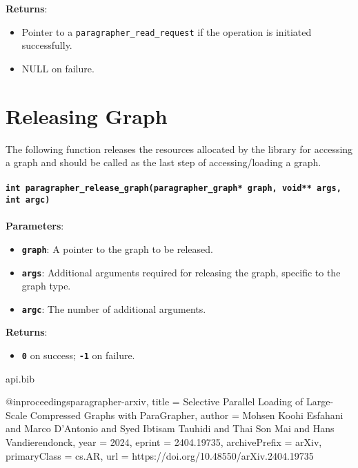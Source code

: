\documentclass[a4paper]{article}
\begin{document}
\textbf{Returns}:
\begin{itemize}
    \setlength{\itemsep}{0pt}
    \setlength{\parskip}{0pt}
    \setlength{\parsep}{0pt}

    \item Pointer to a \texttt{paragrapher\_read\_request} if the operation is initiated successfully.
    \item NULL on failure.
\end{itemize}

\section{Releasing Graph}
The following function releases the resources allocated by the library for accessing a graph and
should be called as the last step of accessing/loading a graph.
\\
\\
\textbf{\texttt{int paragrapher\_release\_graph(paragrapher\_graph* graph, void** args, int argc)}}
\\
\\
\textbf{Parameters}:
\begin{itemize}
    \setlength{\itemsep}{0pt}
    \setlength{\parskip}{0pt}
    \setlength{\parsep}{0pt}

    \item \textbf{\texttt{graph}}: A pointer to the graph to be released.
    \item \textbf{\texttt{args}}: Additional arguments required for releasing the graph, specific to the graph type.
    \item \textbf{\texttt{argc}}: The number of additional arguments.
\end{itemize}
\textbf{Returns}:
\begin{itemize}
    \item \textbf{\texttt{0}} on success; \textbf{\texttt{-1}} on failure.
\end{itemize}


\begin{filecontents}{api.bib}
    
    @inproceedings{paragrapher-arxiv,
        title = { Selective Parallel Loading of Large-Scale 
                  Compressed Graphs with ParaGrapher}, 
        author = { {Mohsen} {Koohi Esfahani} and Marco D'Antonio  and 
                   Syed Ibtisam Tauhidi and Thai Son Mai and 
                   Hans Vandierendonck},
        year = {2024},
        eprint = {2404.19735},
        archivePrefix = {arXiv},
        primaryClass = {cs.AR},
        url = {https://doi.org/10.48550/arXiv.2404.19735}
    }
\end{filecontents} 



\end{document}
